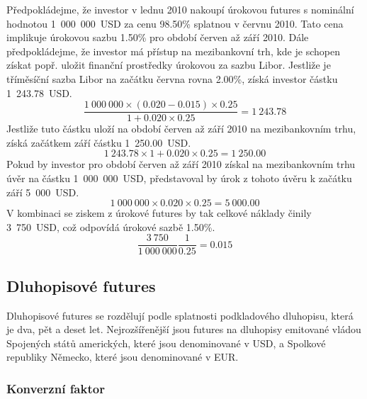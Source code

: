 \documentclass[a4paper]{book}
\begin{document}
Předpokládejme, že investor v lednu 2010 nakoupí úrokovou futures s nominální hodnotou 1~000~000~USD za cenu 98.50\% splatnou v červnu 2010. Tato cena implikuje úrokovou sazbu 1.50\% pro období červen až září 2010. Dále předpokládejme, že investor má přístup na mezibankovní trh, kde je schopen získat popř. uložit finanční prostředky úrokovou za sazbu Libor. Jestliže je tříměsíční sazba Libor na začátku června rovna 2.00\%, získá investor částku 1~243.78~USD.
\begin{equation*}
\frac{1~000~000 \times (0.020 - 0.015) \times 0.25}{1 + 0.020 \times 0.25} = 1~243.78
\end{equation*}
Jestliže tuto částku uloží na období červen až září 2010 na mezibankovním trhu, získá začátkem září částku 1~250.00~USD.
\begin{equation*}
1~243.78 \times {1 + 0.020 \times 0.25} = 1~250.00
\end{equation*}
Pokud by investor pro období červen až září 2010 získal na mezibankovním trhu úvěr na částku 1~000~000~USD, představoval by úrok z tohoto úvěru k začátku září 5~000~USD.
\begin{equation*}
1~000~000 \times 0.020 \times 0.25 = 5~000.00
\end{equation*}
V kombinaci se ziskem z úrokové futures by tak celkové náklady činily 3~750~USD, což odpovídá úrokové sazbě 1.50\%.
\begin{equation*}
\frac{3~750}{1~000~000} \frac{1}{0.25} = 0.015 
\end{equation*}

\subsection{Dluhopisové futures}

Dluhopisové futures se rozdělují podle splatnosti podkladového dluhopisu, která je dva, pět a deset let. Nejrozšířenější jsou futures na dluhopisy emitované vládou Spojených států amerických, které jsou denominované v USD, a Spolkové republiky Německo, které jsou denominované v EUR.

\subsubsection{Konverzní faktor}
\end{document}
